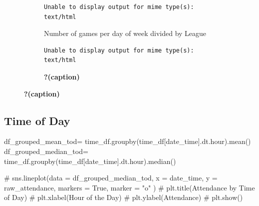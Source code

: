 \documentclass[
  letterpaper,
  DIV=11,
  numbers=noendperiod]{scrartcl}
\newenvironment{Shaded}{\begin{snugshade}}{\end{snugshade}}
\newcommand{\CommentTok}[1]{\textcolor[rgb]{0.37,0.37,0.37}{#1}}
\newcommand{\NormalTok}[1]{\textcolor[rgb]{0.00,0.23,0.31}{#1}}
\newcommand{\OperatorTok}[1]{\textcolor[rgb]{0.37,0.37,0.37}{#1}}
\newcommand{\StringTok}[1]{\textcolor[rgb]{0.13,0.47,0.30}{#1}}
\begin{document}
\begin{figure}
{\begin{figure}

{\centering 

\begin{verbatim}
Unable to display output for mime type(s): text/html
\end{verbatim}

}

\caption{Number of games per day of week divided by League}

\end{figure}

\begin{figure}

{\centering 

\begin{verbatim}
Unable to display output for mime type(s): text/html
\end{verbatim}

}

\caption{\textbf{?(caption)}}

\end{figure}

}

\caption{\label{fig-day_median_attend_div}\textbf{?(caption)}}

\end{figure}

\hypertarget{time-of-day}{%
\subsection{Time of Day}\label{time-of-day}}

\begin{Shaded}
\begin{Highlighting}[]
\NormalTok{df\_grouped\_mean\_tod}\OperatorTok{=}\NormalTok{ time\_df.groupby(time\_df[}\StringTok{\textquotesingle{}date\_time\textquotesingle{}}\NormalTok{].dt.hour).mean()}
\NormalTok{df\_grouped\_median\_tod}\OperatorTok{=}\NormalTok{ time\_df.groupby(time\_df[}\StringTok{\textquotesingle{}date\_time\textquotesingle{}}\NormalTok{].dt.hour).median()}


\CommentTok{\# sns.lineplot(data = df\_grouped\_median\_tod, x = \textquotesingle{}date\_time\textquotesingle{}, y = \textquotesingle{}raw\_attendance\textquotesingle{}, markers = True, marker = "o" )}
\CommentTok{\# plt.title(\textquotesingle{}Attendance by Time of Day\textquotesingle{})}
\CommentTok{\# plt.xlabel(\textquotesingle{}Hour of the Day\textquotesingle{})}
\CommentTok{\# plt.ylabel(\textquotesingle{}Attendance\textquotesingle{})}
\CommentTok{\# plt.show()}
\end{Highlighting}
\end{Shaded}
\end{document}
